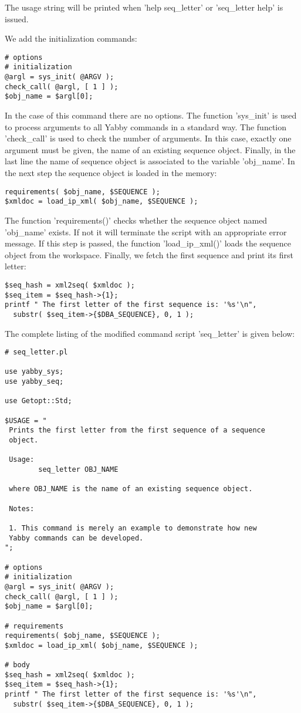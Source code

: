 The usage string will be printed when 'help seq\_letter' or
'seq\_letter help' is issued.

We add the initialization commands:

\begin{verbatim}
# options
# initialization
@argl = sys_init( @ARGV );
check_call( @argl, [ 1 ] );
$obj_name = $argl[0];
\end{verbatim}

In the case of this command there are no options. The function
'sys\_init' is used to process arguments to all Yabby commands
in a standard way. The function 'check\_call' is used to check
the number of arguments.  In this case, exactly one argument
must be given, the name of an existing sequence object.  Finally,
in the last line the name of sequence object is associated to
the variable 'obj\_name'. In the next step the sequence object
is loaded in the memory:
 
\begin{verbatim}
requirements( $obj_name, $SEQUENCE );
$xmldoc = load_ip_xml( $obj_name, $SEQUENCE );
\end{verbatim}

The function 'requirements()' checks whether the sequence object
named 'obj\_name' exists. If not it will terminate the script
with an appropriate error message. If this step is passed, the
function 'load\_ip\_xml()' loads the sequence object from the
workspace. Finally, we fetch the first sequence and print its
first letter:

\begin{verbatim}
$seq_hash = xml2seq( $xmldoc );
$seq_item = $seq_hash->{1};
printf " The first letter of the first sequence is: '%s'\n",
  substr( $seq_item->{$DBA_SEQUENCE}, 0, 1 );
\end{verbatim}

The complete listing of the modified command script 'seq\_letter'
is given below: 

\begin{verbatim}
# seq_letter.pl

use yabby_sys;
use yabby_seq;

use Getopt::Std;

$USAGE = "
 Prints the first letter from the first sequence of a sequence
 object. 

 Usage:
        seq_letter OBJ_NAME

 where OBJ_NAME is the name of an existing sequence object.

 Notes:

 1. This command is merely an example to demonstrate how new
 Yabby commands can be developed.
";

# options
# initialization
@argl = sys_init( @ARGV );
check_call( @argl, [ 1 ] );
$obj_name = $argl[0];

# requirements
requirements( $obj_name, $SEQUENCE );
$xmldoc = load_ip_xml( $obj_name, $SEQUENCE );

# body
$seq_hash = xml2seq( $xmldoc );
$seq_item = $seq_hash->{1};
printf " The first letter of the first sequence is: '%s'\n",
  substr( $seq_item->{$DBA_SEQUENCE}, 0, 1 );
\end{verbatim}

